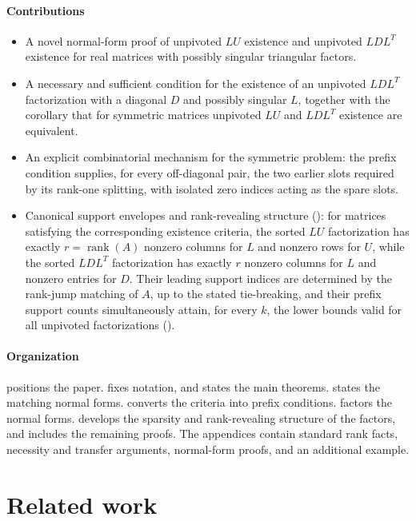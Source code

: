 \documentclass[preprint,12pt]{elsarticle}
\theoremstyle{plain}
\theoremstyle{nonumberplain}
\numberwithin{equation}{section}
\DeclareMathOperator{\rk}{rank}
\numberwithin{theorem}{section}
\begin{document}
\paragraph{Contributions}
\begin{itemize}
  \item A novel normal-form proof of unpivoted $LU$ existence and unpivoted $LDL^T$ existence for real matrices with possibly singular triangular factors.
  \item A necessary and sufficient condition for the existence of an unpivoted $LDL^T$ factorization with a diagonal $D$ and possibly singular $L$, together with the corollary that for symmetric matrices unpivoted $LU$ and $LDL^T$ existence are equivalent.
  \item An explicit combinatorial mechanism for the symmetric problem: the prefix condition supplies, for every off-diagonal pair, the two earlier slots required by its rank-one splitting, with isolated zero indices acting as the spare slots.
  \item Canonical support envelopes and rank-revealing structure (): for matrices satisfying the corresponding existence criteria, the sorted $LU$ factorization has exactly $r=\rk(A)$ nonzero columns for $L$ and nonzero rows for $U$, while the sorted $LDL^T$ factorization has exactly $r$ nonzero columns for $L$ and nonzero entries for $D$. Their leading support indices are determined by the rank-jump matching of $A$, up to the stated tie-breaking, and their prefix support counts simultaneously attain, for every $k$, the lower bounds valid for all unpivoted factorizations ().
\end{itemize}

\paragraph{Organization}  positions the paper.   fixes notation, and  states the main theorems.   states the matching normal forms.   converts the criteria into prefix conditions.  factors the normal forms.  develops the sparsity and rank-revealing structure of the factors, and  includes the remaining proofs.  The appendices contain standard rank facts, necessity and transfer arguments, normal-form proofs, and an additional example.

\section{Related work}\label{sec:related}
\end{document}
